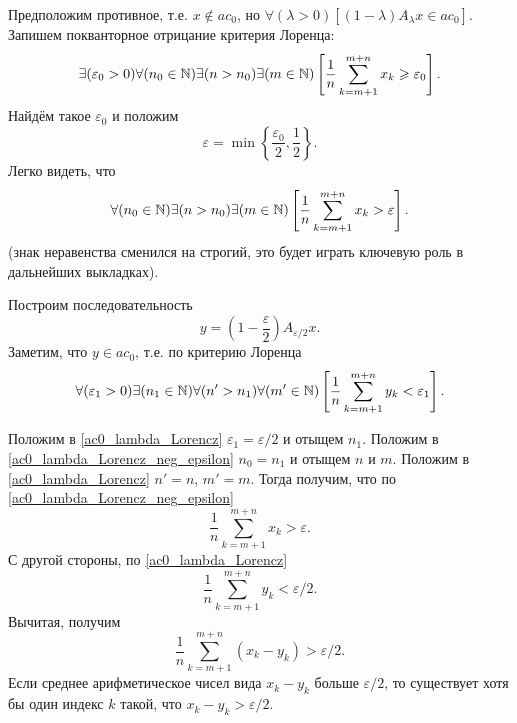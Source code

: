 Предположим противное, т.е. $x\notin ac_0$,
но $\forall(\lambda>0)[(1-\lambda)A_\lambda x \in ac_0]$.
Запишем покванторное отрицание критерия Лоренца:
\begin{equation}\label{ac0_lambda_Lorencz_neg}
	\exists(\varepsilon_0 > 0)
	\forall(n_0 \in \N)
	\exists(n > n_0)
	\exists(m \in \N)
	\left[
		\frac{1}{n}\sum_{k=m+1}^{m+n} x_k \geq \varepsilon_0
	\right]
	.
\end{equation}
Найдём такое $\varepsilon_0$ и положим
\begin{equation}
	\varepsilon = \min\left\{ \frac{\varepsilon_0}{2}, \frac{1}{2} \right\}
	.
\end{equation}
Легко видеть, что
\begin{equation}\label{ac0_lambda_Lorencz_neg_epsilon}
	\forall(n_0 \in \N)
	\exists(n > n_0)
	\exists(m \in \N)
	\left[
		\frac{1}{n}\sum_{k=m+1}^{m+n} x_k > \varepsilon
	\right]
	.
\end{equation}
(знак неравенства сменился на строгий, это будет играть ключевую роль в дальнейших выкладках).

Построим последовательность
\begin{equation}
	y = \left( 1 - \frac{\varepsilon}{2} \right) A_{\varepsilon/2} x
	.
\end{equation}
Заметим, что $y\in ac_0$, т.е. по критерию Лоренца
\begin{equation}\label{ac0_lambda_Lorencz}
	\forall(\varepsilon_1 > 0)
	\exists(n_1 \in \N)
	\forall(n' > n_1)
	\forall(m' \in \N)
	\left[
		\frac{1}{n}\sum_{k=m+1}^{m+n} y_k < \varepsilon_1
	\right]
	.
\end{equation}

Положим в \eqref{ac0_lambda_Lorencz} $\varepsilon_1 = \varepsilon/2$
и отыщем $n_1$.
Положим в \eqref{ac0_lambda_Lorencz_neg_epsilon}
$n_0 = n_1$ и отыщем $n$ и $m$.
Положим в \eqref{ac0_lambda_Lorencz} $n' = n$, $m' = m$.
Тогда получим, что по \eqref{ac0_lambda_Lorencz_neg_epsilon}
\begin{equation}
	\frac{1}{n}\sum_{k=m+1}^{m+n} x_k > \varepsilon
	.
\end{equation}
С другой стороны, по \eqref{ac0_lambda_Lorencz}
\begin{equation}
	\frac{1}{n}\sum_{k=m+1}^{m+n} y_k < \varepsilon/2
	.
\end{equation}
Вычитая, получим
\begin{equation}
	\frac{1}{n}\sum_{k=m+1}^{m+n} (x_k - y_k) > \varepsilon/2
	.
\end{equation}
Если среднее арифметическое чисел вида $x_k - y_k$ больше $\varepsilon/2$,
то существует хотя бы один индекс $k$ такой, что $x_k - y_k > \varepsilon/2$.

